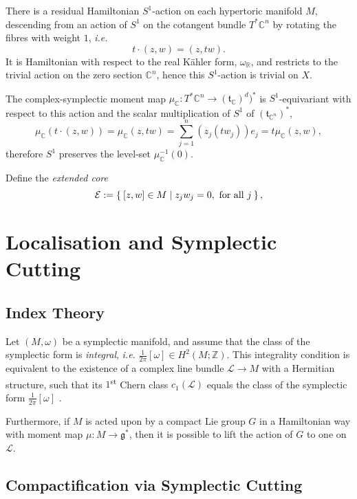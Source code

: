 \documentclass{article}
\newcommand{\ie}{\emph{i.e.} }
\newcommand{\ra}{\rightarrow}
\newcommand{\w}{\omega}
\newcommand{\RR}{\mathbb{R}}
\newcommand{\CC}{\mathbb{C}}
\newcommand{\ZZ}{\mathbb{Z}}
\newcommand{\mcE}{\mathcal{E}}
\newcommand{\mcL}{\mathcal{L}}
\newcommand{\mfg}{\mathfrak{g}}
\newcommand{\mft}{\mathfrak{t}}
\begin{document}
	There is a residual Hamiltonian $S^{1}$-action on each hypertoric manifold $M$, descending from an action of $S^{1}$ on the cotangent bundle $T^{\ast}\CC^{n}$ by rotating the fibres with weight $1$, \ie
	\[
		t\cdot (z,w) = (z,tw).
	\]
	It is Hamiltonian with respect to the real K\"ahler form, $\w_{\RR}$, and restricts to the trivial action on the zero section $\CC^{n}$, hence this $S^{1}$-action is trivial on $X$.
	
	The complex-symplectic moment map $\mu_{\CC} : T^{\ast}\CC^{n} \ra (\mft_{\CC})^{d})^{\ast}$ is $S^{1}$-equivariant with respect to this action and the scalar multiplication of $S^{1}$ of $(\mft_{\CC^{n}})^{\ast}$,
		\[
		\mu_{\CC}\left(t\cdot(z,w)\right) = \mu_{\CC}(z,tw) = \sum_{j=1}^{n}\left(z_{j}(tw_{j})\right)e_{j} = t\mu_{\CC}(z,w),
		\]
	therefore $S^{1}$ preserves the level-set $\mu_{\CC}^{-1}(0)$. 
	
	Define the \emph{extended core}
	\[
		\mcE := \Set{[z,w] \in M | z_{j}w_{j} = 0, \text{ for all } j },
	\]
	
	
	
	\section{Localisation and Symplectic Cutting}
	
	\subsection{Index Theory}
	
	Let $(M, \w)$ be a symplectic manifold, and assume that the class of the symplectic form is \emph{integral}, \ie $\tfrac{1}{2\pi}[\w] \in H^{2}(M; \ZZ)$. This integrality condition is equivalent to the existence of a complex line bundle $\mcL \ra M$ with a Hermitian structure, such that its $1$\textsuperscript{st} Chern class $c_{1}(\mcL)$ equals the class of the symplectic form $\tfrac{1}{2\pi}[\w]$ \cite{Duistermaat2011}.
	
	Furthermore, if $M$ is acted upon by a compact Lie group $G$ in a Hamiltonian way with moment map $\mu : M \ra \mfg^{\ast}$, then it is possible to lift the action of $G$ to one on $\mcL$. 

	\subsection{Compactification via Symplectic Cutting}
	
	
\end{document}
